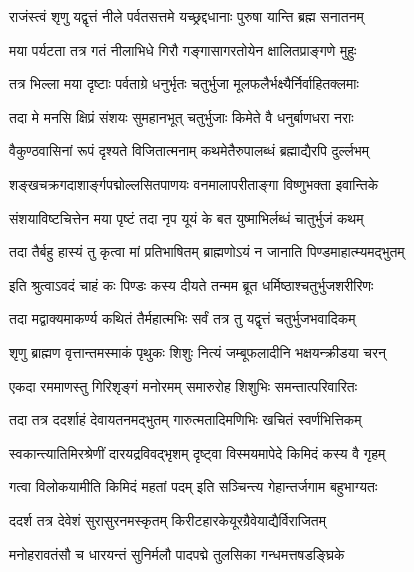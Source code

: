 

\twolineshloka
{राजंस्त्वं शृणु यद्वृत्तं नीले पर्वतसत्तमे}
{यच्छ्रद्दधानाः पुरुषा यान्ति ब्रह्म सनातनम्}%

\twolineshloka
{मया पर्यटता तत्र गतं नीलाभिधे गिरौ}
{गङ्गासागरतोयेन क्षालितप्राङ्गणे मुहुः}%

\twolineshloka
{तत्र भिल्ला मया दृष्टाः पर्वताग्रे धनुर्भृतः}
{चतुर्भुजा मूलफलैर्भक्ष्यैर्निर्वाहितक्लमाः}%

\twolineshloka
{तदा मे मनसि क्षिप्रं संशयः सुमहानभूत्}
{चतुर्भुजाः किमेते वै धनुर्बाणधरा नराः}%

\twolineshloka
{वैकुण्ठवासिनां रूपं दृश्यते विजितात्मनाम्}
{कथमेतैरुपालब्धं ब्रह्माद्यैरपि दुर्ल्लभम्}%

\twolineshloka
{शङ्खचक्रगदाशार्ङ्गपद्मोल्लसितपाणयः}
{वनमालापरीताङ्गा विष्णुभक्ता इवान्तिके}%

\twolineshloka
{संशयाविष्टचित्तेन मया पृष्टं तदा नृप}
{यूयं के बत युष्माभिर्लब्धं चातुर्भुजं कथम्}%

\twolineshloka
{तदा तैर्बहु हास्यं तु कृत्वा मां प्रतिभाषितम्}
{ब्राह्मणोऽयं न जानाति पिण्डमाहात्म्यमद्भुतम्}%

\twolineshloka
{इति श्रुत्वाऽवदं चाहं कः पिण्डः कस्य दीयते}
{तन्मम ब्रूत धर्मिष्ठाश्चतुर्भुजशरीरिणः}%

\twolineshloka
{तदा मद्वाक्यमाकर्ण्य कथितं तैर्महात्मभिः}
{सर्वं तत्र तु यद्वृत्तं चतुर्भुजभवादिकम्}%


\twolineshloka
{शृणु ब्राह्मण वृत्तान्तमस्माकं पृथुकः शिशुः}
{नित्यं जम्बूफलादीनि भक्षयन्क्रीडया चरन्}%

\twolineshloka
{एकदा रममाणस्तु गिरिशृङ्गं मनोरमम्}
{समारुरोह शिशुभिः समन्तात्परिवारितः}%

\twolineshloka
{तदा तत्र ददर्शाहं देवायतनमद्भुतम्}
{गारुत्मतादिमणिभिः खचितं स्वर्णभित्तिकम्}%

\twolineshloka
{स्वकान्त्यातिमिरश्रेणीं दारयद्रविवद्भृशम्}
{दृष्ट्वा विस्मयमापेदे किमिदं कस्य वै गृहम्}%

\twolineshloka
{गत्वा विलोकयामीति किमिदं महतां पदम्}
{इति सञ्चिन्त्य गेहान्तर्जगाम बहुभाग्यतः}%

\twolineshloka
{ददर्श तत्र देवेशं सुरासुरनमस्कृतम्}
{किरीटहारकेयूरग्रैवेयाद्यैर्विराजितम्}%

\twolineshloka
{मनोहरावतंसौ च धारयन्तं सुनिर्मलौ}
{पादपद्मे तुलसिका गन्धमत्तषडङ्घ्रिके}%

